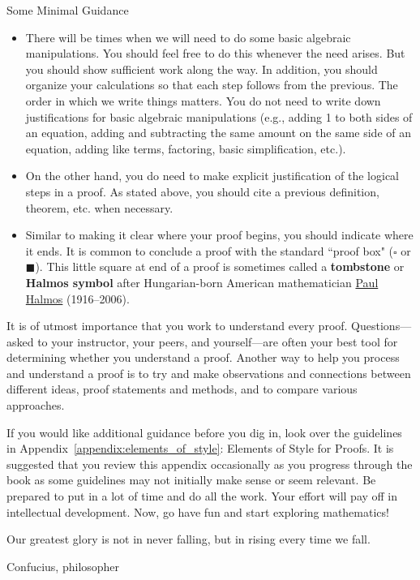 \begin{section}{Some Minimal Guidance}
\begin{itemize}
\item There will be times when we will need to do some basic algebraic manipulations.  You should feel free to do this whenever the need arises.  But you should show sufficient work along the way.  In addition, you should organize your calculations so that each step follows from the previous.  The order in which we write things matters. You do not need to write down justifications for basic algebraic manipulations (e.g., adding 1 to both sides of an equation, adding and subtracting the same amount on the same side of an equation, adding like terms, factoring, basic simplification, etc.).  
\item On the other hand, you do need to make explicit justification of the logical steps in a proof.  As stated above, you should cite a previous definition, theorem, etc. when necessary.
\item Similar to making it clear where your proof begins, you should indicate where it ends.  It is common to conclude a proof with the standard ``proof box" ($\square$ or $\blacksquare$).  This little square at end of a proof is sometimes called a \textbf{tombstone} or \textbf{Halmos symbol} after Hungarian-born American mathematician \href{https://en.wikipedia.org/wiki/Paul_Halmos}{Paul Halmos} (1916--2006).
\end{itemize}

It is of utmost importance that you work to understand every proof.  Questions---asked to your instructor, your peers, and yourself---are often your best tool for determining whether you understand a proof.  Another way to help you process and understand a proof is to try and make observations and connections between different ideas, proof statements and methods, and to compare various approaches. 

If you would like additional guidance before you dig in, look over the guidelines in Appendix~\ref{appendix:elements_of_style}: Elements of Style for Proofs. It is suggested that you review this appendix occasionally as you progress through the book as some guidelines may not initially make sense or seem relevant.  Be prepared to put in a lot of time and do all the work. Your effort will pay off in intellectual development. Now, go have fun and start exploring mathematics!

\epigraph{Our greatest glory is not in never falling, but in rising every time we fall.}{Confucius, philosopher}

\end{section}